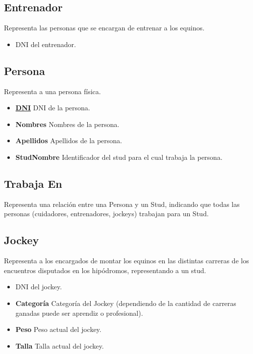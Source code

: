\documentclass[a4paper,11pt]{article}
\begin{document}
\subsection{Entrenador}

Representa las personas que se encargan de entrenar a los equinos.

\begin{itemize}

        \item \textbf{\uline{}} DNI del entrenador.
	
\end{itemize}

\subsection{Persona}

Representa a una persona física.

\begin{itemize}

	\item \textbf{\uline{DNI}} DNI de la persona.
	
	\item \textbf{Nombres} Nombres de la persona.
	
	\item \textbf{Apellidos} Apellidos de la persona.
	
	\item \textbf{StudNombre} Identificador del stud para el cual trabaja la persona.
	
\end{itemize}

\subsection{Trabaja En}

Representa una relación entre una Persona y un Stud, indicando que todas las personas (cuidadores, 
entrenadores, jockeys) trabajan para un Stud.

\subsection{Jockey}

Representa a los encargados de montar los equinos en las distintas carreras 
de los encuentros disputados en los hipódromos, representando a un stud.

\begin{itemize}

        \item \textbf{\uline{}} DNI del jockey.
	
	\item \textbf{Categoría} Categoría del Jockey (dependiendo de la cantidad
	de carreras ganadas puede ser aprendiz o profesional).
	
	\item \textbf{Peso} Peso actual del jockey.
	
	\item \textbf{Talla} Talla actual del jockey.

\end{itemize}
\end{document}
